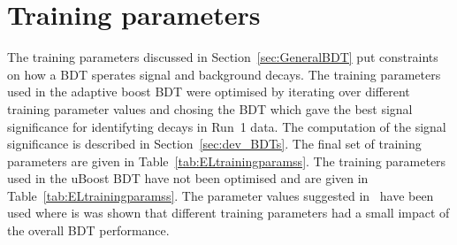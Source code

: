 
\section{Training parameters}
The training parameters discussed in Section~\ref{sec:GeneralBDT} put constraints on how a BDT sperates signal and background decays. 
The training parameters used in the adaptive boost BDT were optimised by iterating over different training parameter values and chosing the BDT which gave the best signal significance for identifyting \bhh decays in Run~1 data. The computation of the signal significance is described in Section~\ref{sec:dev_BDTs}. %
The final set of training parameters are given in Table~\ref{tab:ELtrainingparamss}. %
The training parameters used in the uBoost BDT have not been optimised and are given in Table~\ref{tab:ELtrainingparamss}. The parameter values suggested in~\cite{Stevens:2013dya} have been used where is was shown that different training parameters had a small impact of the overall BDT performance. %
